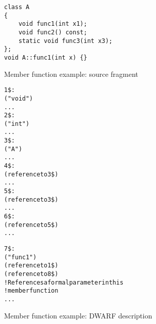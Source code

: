 \begin{figure}[h]
\begin{lstlisting}
class A
{
    void func1(int x1);
    void func2() const;
    static void func3(int x3);
};
void A::func1(int x) {}
\end{lstlisting}
\caption{Member function example: source fragment}
\label{fig:memberfunctionexamplesourcefragment}
\end{figure}

\begin{figure}[h]
\begin{dwflisting}
\begin{alltt}
1\$: \DWTAGunspecifiedtype
        \DWATname("void")
                ...
2\$: \DWTAGbasetype
        \DWATname("int")
        ...
3\$: \DWTAGclasstype
        \DWATname("A")
        ...
4\$:    \DWTAGpointertype
            \DWATtype(reference to 3\$)
            ...
5\$:    \DWTAGconsttype
            \DWATtype(reference to 3\$)
            ...
6\$:    \DWTAGpointertype
            \DWATtype(reference to 5\$)
            ...

7\$:    \DWTAGsubprogram
            \DWATdeclaration
            \DWATname("func1")
            \DWATtype(reference to 1\$)
            \DWATobjectpointer(reference to 8\$) 
                ! References a formal parameter in this 
                ! member function
            ...
\end{alltt}
\end{dwflisting}
\caption{Member function example: DWARF description}
\label{fig:memberfunctionexampledwarfdescription}
\end{figure}

